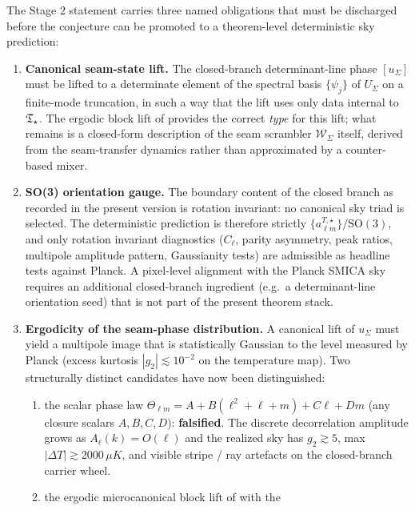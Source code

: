 \begin{remark}
\label{rem:stage2-open-obligations}
The Stage 2 statement  carries three named obligations that
must be discharged before the conjecture can be promoted to a theorem-level deterministic sky
prediction:
\begin{enumerate}[label=(O\arabic*),leftmargin=2.4em,topsep=3pt,itemsep=2pt]
\item \textbf{Canonical seam-state lift.} The closed-branch determinant-line phase $[u_\Sigma]$
must be lifted to a determinate element of the spectral basis $\{\psi_j\}$ of $U_\Sigma$ on a
finite-mode truncation, in such a way that the lift uses only data internal to $\mathfrak T_{\star}$. The
ergodic block lift of  provides the correct \emph{type} for
this lift; what remains is a closed-form description of the seam scrambler $\mathcal W_\Sigma$
itself, derived from the seam-transfer dynamics rather than approximated by a counter-based mixer.
\item \textbf{SO(3) orientation gauge.} The boundary content of the closed branch as recorded in
the present version is rotation invariant: no canonical sky triad is selected. The deterministic
prediction is therefore strictly $\{a_{\ell m}^{T,\star}\}/\mathrm{SO}(3)$, and only rotation
invariant diagnostics
($C_\ell$, parity asymmetry, peak ratios, multipole amplitude pattern, Gaussianity tests) are
admissible as headline tests against Planck. A pixel-level alignment with the Planck SMICA sky
requires an additional closed-branch ingredient (e.g.\ a determinant-line orientation seed) that
is not part of the present theorem stack.
\item \textbf{Ergodicity of the seam-phase distribution.} A canonical lift of $u_\Sigma$ must
yield a multipole image that is statistically Gaussian to the level measured by Planck (excess
kurtosis $|g_2|\lesssim 10^{-2}$ on the temperature map). Two structurally distinct candidates
have now been distinguished:
\begin{enumerate}[label=(\alph*),leftmargin=2em,topsep=2pt,itemsep=1pt]
\item the scalar phase law $\Theta_{\ell m}=A+B(\ell^2+\ell+m)+C\ell+Dm$ (any closure scalars
$A,B,C,D$): \textbf{falsified}. The discrete decorrelation amplitude grows as $A_\ell(k)=O(\ell)$
and the realized sky has $g_2\gtrsim 5$, max $|\Delta T|\gtrsim 2000\,\mu K$, and visible
stripe / ray artefacts on the closed-branch carrier wheel.
\item the ergodic microcanonical block lift of  with the

\end{enumerate}
\end{enumerate}
\end{remark}
